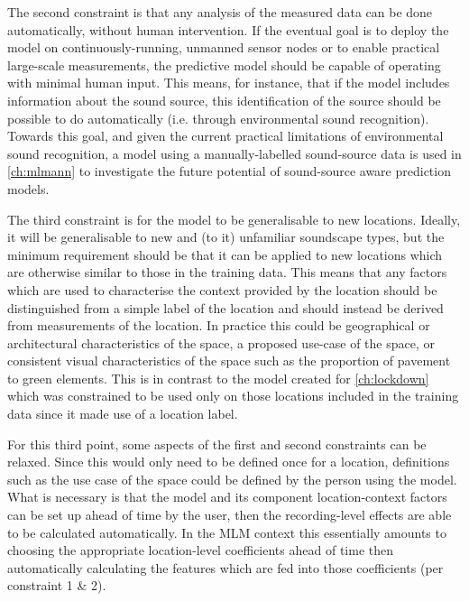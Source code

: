 The second constraint is that any analysis of the measured data can be done automatically, without human intervention. If the eventual goal is to deploy the model on continuously-running, unmanned sensor nodes or to enable practical large-scale measurements, the predictive model should be capable of operating with minimal human input. This means, for instance, that if the model includes information about the sound source, this identification of the source should be possible to do automatically (i.e. through environmental sound recognition). Towards this goal, and given the current practical limitations of environmental sound recognition, a model using a manually-labelled sound-source data is used in \cref{ch:mlmann} to investigate the future potential of sound-source aware prediction models.

The third constraint is for the model to be generalisable to new locations. Ideally, it will be generalisable to new and (to it) unfamiliar soundscape types, but the minimum requirement should be that it can be applied to new locations which are otherwise similar to those in the training data. This means that any factors which are used to characterise the context provided by the location should be distinguished from a simple label of the location and should instead be derived from measurements of the location. In practice this could be geographical or architectural characteristics of the space, a proposed use-case of the space, or consistent visual characteristics of the space such as the proportion of pavement to green elements. This is in contrast to the model created for \cref{ch:lockdown} which was constrained to be used only on those locations included in the training data since it made use of a location label.

For this third point, some aspects of the first and second constraints can be relaxed. Since this would only need to be defined once for a location, definitions such as the use case of the space could be defined by the person using the model. What is necessary is that the model and its component location-context factors can be set up ahead of time by the user, then the recording-level effects are able to be calculated automatically. In the MLM context this essentially amounts to choosing the appropriate location-level coefficients ahead of time then automatically calculating the features which are fed into those coefficients (per constraint 1 \& 2).


